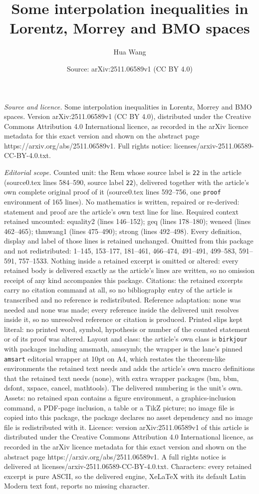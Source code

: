 \documentclass[10pt,a4paper]{amsart}
\title[Some interpolation inequalities in Lorentz, Morrey and BMO s]{Some interpolation inequalities in Lorentz, Morrey and BMO spaces}
\author{Hua Wang}
\date{Source: arXiv:2511.06589v1 (CC BY 4.0)}
\begin{document}
\maketitle

\noindent\emph{Source and licence.} Some interpolation inequalities in Lorentz, Morrey and BMO spaces. Version arXiv:2511.06589v1 (CC BY 4.0), distributed under the Creative Commons Attribution 4.0 International licence, as recorded in the arXiv licence metadata for this exact version and shown on the abstract page https://arxiv.org/abs/2511.06589v1. Full rights notice: licenses/arxiv-2511.06589-CC-BY-4.0.txt.\par\smallskip

\noindent\textit{Editorial scope.} Counted unit: the Rem whose source label is \texttt{22} in the article (source0.tex lines 584--590, source label \texttt{22}), delivered together with the article's own complete original proof of it (source0.tex lines 592--756, one \texttt{proof} environment of 165 lines). No mathematics is written, repaired or re-derived: statement and proof are the article's own text line for line. Required context retained uncounted: equality2 (lines 146--152); geq (lines 178--180); weneed (lines 462--465); thmwang1 (lines 475--490); strong (lines 492--498). Every definition, display and label of those lines is retained unchanged. Omitted from this package and not redistributed: 1--145, 153--177, 181--461, 466--474, 491--491, 499--583, 591--591, 757--1533. Nothing inside a retained excerpt is omitted or altered: every retained body is delivered exactly as the article's lines are written, so no omission receipt of any kind accompanies this package. Citations: the retained excerpts carry no citation command at all, so no bibliography entry of the article is transcribed and no reference is redistributed. Reference adaptation: none was needed and none was made; every reference inside the delivered unit resolves inside it, so no unresolved reference or citation is produced. Printed slips kept literal: no printed word, symbol, hypothesis or number of the counted statement or of its proof was altered. Layout and class: the article's own class is \texttt{birkjour} with packages including amsmath, amssymb; the wrapper is the lane's pinned \texttt{amsart} editorial wrapper at 10pt on A4, which restates the theorem-like environments the retained text needs and adds the article's own macro definitions that the retained text needs (none), with extra wrapper packages (bm, bbm, dsfont, xspace, cancel, mathtools). The delivered numbering is the unit's own. Assets: no retained span contains a figure environment, a graphics-inclusion command, a PDF-page inclusion, a table or a TikZ picture; no image file is copied into this package, the package declares no asset dependency and no image file is redistributed with it. Licence: version arXiv:2511.06589v1 of this article is distributed under the Creative Commons Attribution 4.0 International licence, as recorded in the arXiv licence metadata for this exact version and shown on the abstract page https://arxiv.org/abs/2511.06589v1. A full rights notice is delivered at licenses/arxiv-2511.06589-CC-BY-4.0.txt. Characters: every retained excerpt is pure ASCII, so the delivered engine, XeLaTeX with its default Latin Modern text font, reports no missing character.
\end{document}
